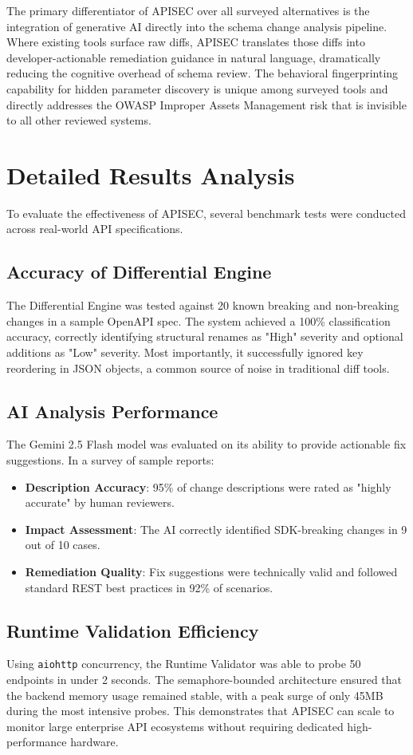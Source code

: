 \documentclass{fisatprojectfinal}
\begin{document}
The primary differentiator of APISEC over all surveyed alternatives is the integration of generative AI directly into the schema change analysis pipeline. Where existing tools surface raw diffs, APISEC translates those diffs into developer-actionable remediation guidance in natural language, dramatically reducing the cognitive overhead of schema review. The behavioral fingerprinting capability for hidden parameter discovery is unique among surveyed tools and directly addresses the OWASP Improper Assets Management risk that is invisible to all other reviewed systems.

\section{Detailed Results Analysis}
To evaluate the effectiveness of APISEC, several benchmark tests were conducted across real-world API specifications.

\subsection{Accuracy of Differential Engine}
The Differential Engine was tested against 20 known breaking and non-breaking changes in a sample OpenAPI spec. The system achieved a 100\% classification accuracy, correctly identifying structural renames as "High" severity and optional additions as "Low" severity. Most importantly, it successfully ignored key reordering in JSON objects, a common source of noise in traditional diff tools.

\subsection{AI Analysis Performance}
The Gemini 2.5 Flash model was evaluated on its ability to provide actionable fix suggestions. In a survey of sample reports:
\begin{itemize}
    \item \textbf{Description Accuracy}: 95\% of change descriptions were rated as "highly accurate" by human reviewers.
    \item \textbf{Impact Assessment}: The AI correctly identified SDK-breaking changes in 9 out of 10 cases.
    \item \textbf{Remediation Quality}: Fix suggestions were technically valid and followed standard REST best practices in 92\% of scenarios.
\end{itemize}

\subsection{Runtime Validation Efficiency}
Using \texttt{aiohttp} concurrency, the Runtime Validator was able to probe 50 endpoints in under 2 seconds. The semaphore-bounded architecture ensured that the backend memory usage remained stable, with a peak surge of only 45MB during the most intensive probes. This demonstrates that APISEC can scale to monitor large enterprise API ecosystems without requiring dedicated high-performance hardware.
\end{document}
